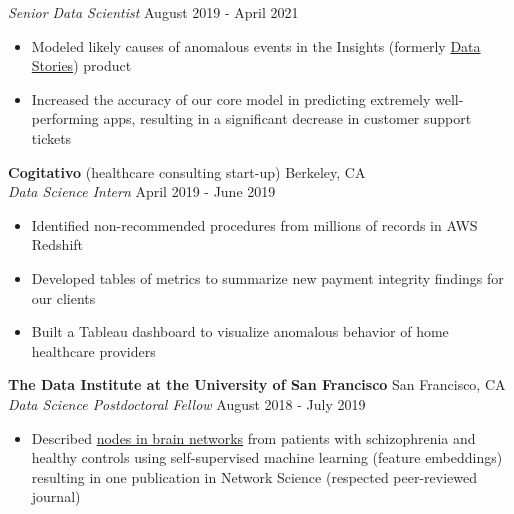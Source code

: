 \documentclass[line,margin,10pt]{res}
\begin{document}
\begin{resume}
\begin{itemize}
\end{itemize}
{\vspace{-0.25cm}}
{\sl Senior Data Scientist} \hfill August 2019 - April 2021
\begin{itemize} \itemsep -2pt
\item Modeled likely causes of anomalous events in the Insights (formerly \href{https://www.appannie.com/en/insights/product-announcements/data-stories-labs/}{Data Stories}) product
\item Increased the accuracy of our core model in predicting extremely well-performing apps, resulting in a significant decrease in customer support tickets
\end{itemize}
{\vspace{-0.25cm}}
\textbf{Cogitativo} (healthcare consulting start-up) \hfill Berkeley, CA\\
{\sl Data Science Intern} \hfill April 2019 - June 2019
\begin{itemize} \itemsep -2pt
\item Identified non-recommended procedures from millions of records in AWS Redshift
\item Developed tables of metrics to summarize new payment integrity findings for our clients
\item Built a Tableau dashboard to visualize anomalous behavior of home healthcare providers
\end{itemize}
{\vspace{-0.25cm}}
\textbf{The Data Institute at the University of San Francisco} \hfill San Francisco, CA \\
{\sl Data Science Postdoctoral Fellow} \hfill August 2018 - July 2019
\begin{itemize} \itemsep -2pt
\item Described \href{https://www.youtube.com/watch?v=8Ng_aMgIZLw&feature=youtu.be}{nodes in brain networks} from patients with schizophrenia and healthy controls using self-supervised machine learning (feature embeddings) resulting in one publication in Network Science (respected peer-reviewed journal)

\end{itemize}
\end{resume}
\end{document}
